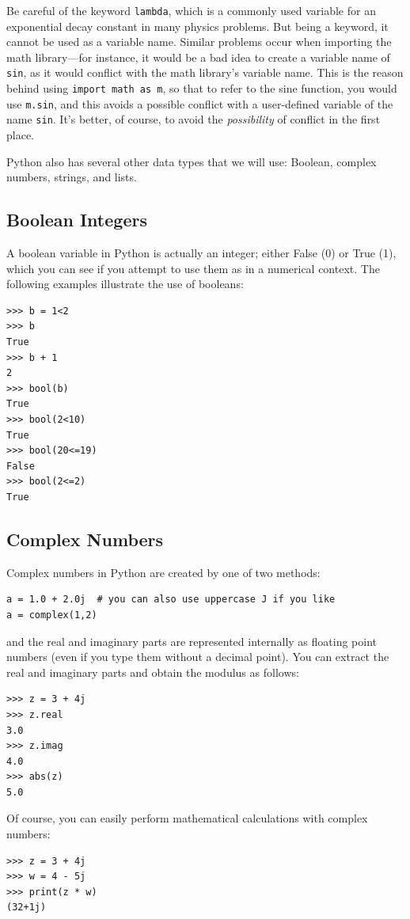 Be careful of the keyword \texttt{lambda}, which is a commonly used variable for an exponential decay constant in many physics problems. But being a keyword, it cannot be used as a variable name. Similar problems occur when importing the math library---for instance, it would be a bad idea to create a variable name of \texttt{sin}, as it would conflict with the math library's variable name. This is the reason behind using \texttt{import math as m}, so that to refer to the sine function, you would use \texttt{m.sin}, and this avoids a possible conflict with a user-defined variable of the name \texttt{sin}. It's better, of course, to avoid the \textit{possibility} of conflict in the first place.

Python also has several other data types that we will use: Boolean, complex numbers, strings, and lists. 

\subsection{Boolean Integers}
\label{subsec-boolean}
A boolean variable in Python is actually an integer; either False (0) or True (1), which you can see if you attempt to use them as in a numerical context. The following examples illustrate the use of booleans: 
\begin{lstlisting}[frame=none]
>>> b = 1<2 
>>> b
True
>>> b + 1
2
>>> bool(b)
True
>>> bool(2<10)
True
>>> bool(20<=19)
False
>>> bool(2<=2)
True
\end{lstlisting}
\subsection{Complex Numbers	}
\label{subsec-complex}
Complex numbers in Python are created by one of two methods: 
\begin{lstlisting}[frame=none]
a = 1.0 + 2.0j 	# you can also use uppercase J if you like
a = complex(1,2)
\end{lstlisting}
and the real and imaginary parts are represented internally as floating point numbers (even if you type them without a decimal point). You can extract the real and imaginary parts and obtain the modulus  as follows:
\begin{lstlisting}[frame=none]
>>> z = 3 + 4j 
>>> z.real
3.0
>>> z.imag
4.0
>>> abs(z)
5.0
\end{lstlisting}
Of course, you can easily perform mathematical calculations with complex numbers:
\begin{lstlisting}[frame=none]
>>> z = 3 + 4j 
>>> w = 4 - 5j
>>> print(z * w)
(32+1j)
\end{lstlisting}

